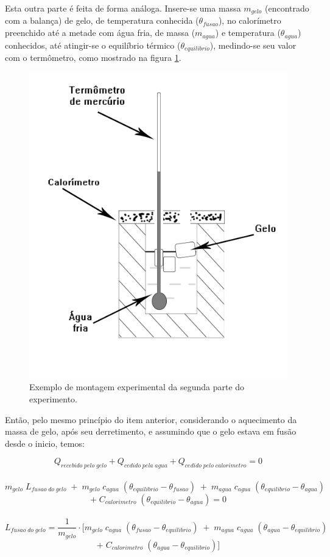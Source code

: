\documentclass[12pt,a4paper]{article}
\begin{document}
Esta outra parte é feita de forma análoga. Insere-se uma massa $m_{gelo}$ (encontrado com a balança) de gelo, de temperatura conhecida ($\theta_{fusao}$), no calorímetro preenchido até a metade com água fria, de massa ($m_{agua}$) e temperatura ($\theta_{agua}$) conhecidos, até atingir-se o equilíbrio térmico ($\theta_{equilibrio}$), medindo-se seu valor com o termômetro, como mostrado na figura \ref{CalorGelo}.

\begin{figure}[!htbp]
\centering
\includegraphics[scale=0.45]{Fig6b2.jpg}
\caption{Exemplo de montagem experimental da segunda parte do experimento.}
\label{CalorGelo}
\end{figure}

Então, pelo mesmo princípio do item anterior, considerando o aquecimento da massa de gelo, após seu derretimento, e assumindo que o gelo estava em fusão desde o inicio, temos:

$$Q_{recebido\;pelo\;gelo} + Q_{cedido\;pela\;agua} + Q_{cedido\;pelo\;calorimetro} = 0$$\
$$m_{gelo} \; L_{fusao\;do\;gelo} \; + \; m_{gelo} \; c_{agua} \; (\theta_{equilibrio} - \theta_{fusao}) \; + \; m_{agua} \; c_{agua} \; (\theta_{equilibrio} - \theta_{agua}) \;$$ $$+ \; C_{calorimetro} \; (\theta_{equilibrio} - \theta_{agua}) = 0$$\
$$L_{fusao\;do\;gelo} = \frac{1}{m_{gelo}} \cdot [m_{gelo} \; c_{agua} \; (\theta_{fusao} - \theta_{equilibrio}) \; + \; m_{agua} \; c_{agua} \; (\theta_{agua} - \theta_{equilibrio}) \;$$ 
$$ + \; C_{calorimetro} \; (\theta_{agua} - \theta_{equilibrio})]$$
\end{document}
